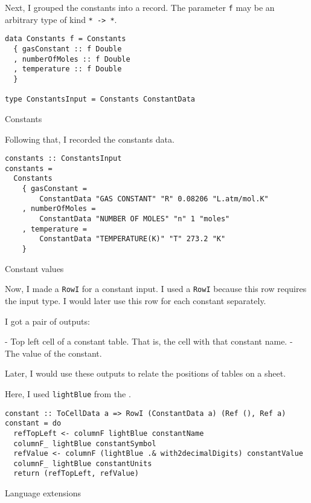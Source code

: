 Next, I grouped the constants into a record. The parameter \texttt{f} may be an arbitrary type of kind \texttt{* -> *}.

\begin{listing}[!h]
  \begin{verbatim}
data Constants f = Constants
  { gasConstant :: f Double
  , numberOfMoles :: f Double
  , temperature :: f Double
  }

type ConstantsInput = Constants ConstantData
\end{verbatim}
\caption{Constants}
\label{example3:constants}
\end{listing}

Following that, I recorded the constants data.

\begin{listing}[!h]
  \begin{verbatim}
constants :: ConstantsInput
constants =
  Constants
    { gasConstant =
        ConstantData "GAS CONSTANT" "R" 0.08206 "L.atm/mol.K"
    , numberOfMoles =
        ConstantData "NUMBER OF MOLES" "n" 1 "moles"
    , temperature =
        ConstantData "TEMPERATURE(K)" "T" 273.2 "K"
    }
\end{verbatim}
\caption{Constant values}
\label{example3:constantValues}
\end{listing}

Now, I made a \texttt{RowI} for a constant input.
I used a \texttt{RowI} because this row requires the input type.
I would later use this row for each constant separately.

I got a pair of outputs:

- Top left cell of a constant table. That is, the cell with that constant name.
- The value of the constant.

Later, I would use these outputs to relate the positions of tables on a sheet.

Here, I used \texttt{lightBlue} from the .

\begin{listing}[!h]
  \begin{verbatim}
constant :: ToCellData a => RowI (ConstantData a) (Ref (), Ref a)
constant = do
  refTopLeft <- columnF lightBlue constantName
  columnF_ lightBlue constantSymbol
  refValue <- columnF (lightBlue .& with2decimalDigits) constantValue
  columnF_ lightBlue constantUnits
  return (refTopLeft, refValue)
\end{verbatim}
\caption{Language extensions}
\label{example3:constantCode}
\end{listing}

